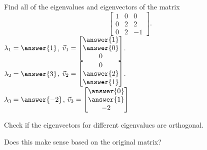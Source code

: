 \documentclass{ximera}
\begin{document}
\begin{exercise}%
    Find all of the eigenvalues and eigenvectors of the matrix
    \[ 
        \begin{bmatrix}
            1 & 0 & 0 \\ 
            0 & 2 & 2 \\ 
            0 & 2 & -1 
        \end{bmatrix}. 
    \]
    $\lambda_1 = \answer{1}$, $\vec{v}_1 = \begin{bmatrix} \answer{1} \\ \answer{0} \\ 0 \end{bmatrix}$. \\
    $\lambda_2 = \answer{3}$, $\vec{v}_2 = \begin{bmatrix} 0 \\ \answer{2} \\ \answer{1} \end{bmatrix}$.  \\
    $\lambda_3 = \answer{-2}$, $\vec{v}_3 = \begin{bmatrix} \answer{0} \\ \answer{1} \\-2 \end{bmatrix}$
    \begin{problem}
        Check if the eigenvectors for different eigenvalues are orthogonal. 
        \begin{multipleChoice}
        \end{multipleChoice}
        \begin{problem}
            Does this make sense based on the original matrix? 
        \end{problem}
    \end{problem}
\end{exercise}
\end{document}
